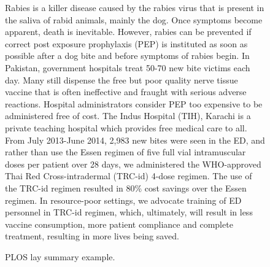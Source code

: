 \documentclass[11pt]{article}
\begin{document}
\begin{figure*}
\begin{minipage}{\textwidth}
{{            Rabies is a killer disease caused by the rabies virus that is present in the saliva of rabid animals, mainly the dog. Once symptoms become apparent, death is inevitable. However, rabies can be prevented if correct post exposure prophylaxis (PEP) is instituted as soon as possible after a dog bite and before symptoms of rabies begin. In Pakistan, government hospitals treat 50-70 new bite victims each day. Many still dispense the free but poor quality nerve tissue vaccine that is often ineffective and fraught with serious adverse reactions. Hospital administrators consider PEP too expensive to be administered free of cost. The Indus Hospital (TIH), Karachi is a private teaching hospital which provides free medical care to all. From July 2013-June 2014, 2,983 new bites were seen in the ED, and rather than use the Essen regimen of five full vial intramuscular doses per patient over 28 days, we administered the WHO-approved Thai Red Cross-intradermal (TRC-id) 4-dose regimen. The use of the TRC-id regimen resulted in 80\% cost savings over the Essen regimen. In resource-poor settings, we advocate training of ED personnel in TRC-id regimen, which, ultimately, will result in less vaccine consumption, more patient compliance and complete treatment, resulting in more lives being saved.
        }}
  \end{minipage} \quad
    \caption{PLOS lay summary example.}
  \label{fig:laysum_example_plos}
\end{figure*}
\end{document}
